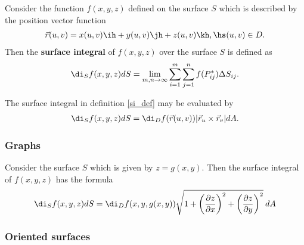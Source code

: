 \documentclass{article}
\begin{document}
\begin{definition}
	\label{si_def}
	Consider the function $f(x,y,z)$ defined on the surface $S$ which is described by the
	position vector function
	\begin{align*}
		\vec r(u,v) = x(u,v)\ih + y(u,v)\jh + z(u,v)\kh,\hs (u,v)\in D.
	\end{align*}
	Then the \textbf{surface integral} of $f(x,y,z)$ over the surface $S$ is defined as
	\begin{align*}
		\di_S f(x,y,z)dS = \lim_{m,n\to\infty}\sum_{i=1}^m\sum_{j=1}^n f(P_{ij}^*)\Delta S_{ij}.
	\end{align*}
\end{definition}
\begin{theorem}
	The surface integral in definition \ref{si_def} may be evaluated by
	\begin{align*}
		\di_S f(x,y,z)dS = \di_D f(\vec r(u,v)) |\vec r_u\times \vec r_v|dA.
	\end{align*}
\end{theorem}

\subsubsection{Graphs}

\begin{theorem}
	Consider the surface $S$ which is given by $z=g(x,y)$. Then the surface integral
	of $f(x,y,z)$ has the formula
	\begin{align*}
		\di_S f(x,y,z)dS = \di_D f(x,y,g(x,y))\sqrt{1+\left(\frac{\partial z}{\partial x}\right)^2+\left(\frac{\partial z}{\partial y}\right)^2}\:dA
	\end{align*}
\end{theorem}

\subsubsection{Oriented surfaces}
\end{document}
